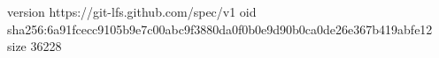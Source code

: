 version https://git-lfs.github.com/spec/v1
oid sha256:6a91fcecc9105b9e7c00abc9f3880da0f0b0e9d90b0ca0de26e367b419abfe12
size 36228
